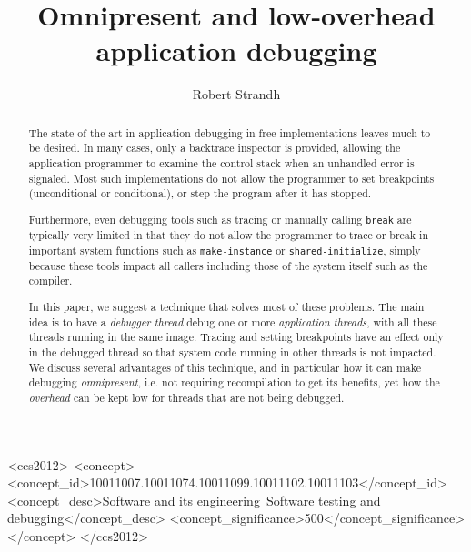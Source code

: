 \documentclass[format=sigconf]{acmart}
\def\inputtex#1{}
\begin{document}
\title{Omnipresent and low-overhead application debugging}

\author{Robert Strandh}


\begin{abstract}
The state of the art in application debugging in free \commonlisp{}
implementations leaves much to be desired.  In many cases, only a
backtrace inspector is provided, allowing the application programmer
to examine the control stack when an unhandled error is signaled.
Most such implementations do not allow the programmer to set
breakpoints (unconditional or conditional), or step the program after
it has stopped.

Furthermore, even debugging tools such as tracing or manually calling
\texttt{break} are typically very limited in that they do not allow
the programmer to trace or break in important system functions such as
\texttt{make-instance} or \texttt{shared-initialize}, simply because
these tools impact all callers including those of the system itself
such as the compiler.

In this paper, we suggest a technique that solves most of these
problems.  The main idea is to have a \emph{debugger thread} debug one
or more \emph{application threads}, with all these threads running in
the same image.  Tracing and setting breakpoints have an effect only
in the debugged thread so that system code running in other threads is
not impacted.  We discuss several advantages of this technique, and in
particular how it can make debugging \emph{omnipresent}, i.e. not
requiring recompilation to get its benefits, yet how the
\emph{overhead} can be kept low for threads that are not being
debugged.
\end{abstract}

\begin{CCSXML}
<ccs2012>
<concept>
<concept_id>10011007.10011074.10011099.10011102.10011103</concept_id>
<concept_desc>Software and its engineering~Software testing and debugging</concept_desc>
<concept_significance>500</concept_significance>
</concept>
</ccs2012>
\end{CCSXML}



\maketitle


\inputtex{sec-introduction.tex}
\inputtex{sec-previous.tex}
\inputtex{sec-sicl.tex}
\inputtex{sec-our-method.tex}
\inputtex{sec-benefits.tex}
\inputtex{sec-disadvantages.tex}
\inputtex{sec-conclusions.tex}
\inputtex{sec-acknowledgments.tex}


%

\end{document}
